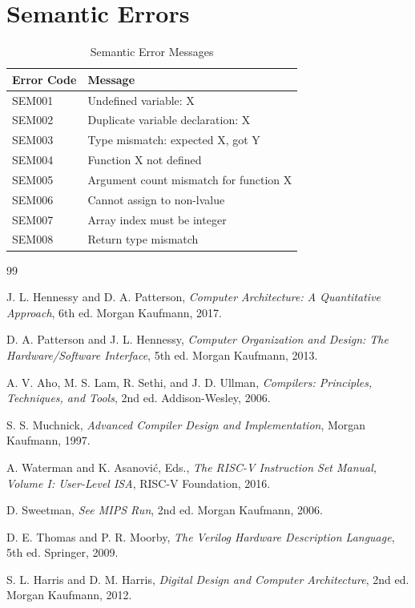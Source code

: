 \documentclass[12pt,a4paper,oneside]{book}
\begin{document}
\section{Semantic Errors}

\begin{table}[H]
\centering
\caption{Semantic Error Messages}
\begin{tabularx}{\textwidth}{|l|X|}
\hline
\textbf{Error Code} & \textbf{Message} \\
\hline
SEM001 & Undefined variable: X \\
SEM002 & Duplicate variable declaration: X \\
SEM003 & Type mismatch: expected X, got Y \\
SEM004 & Function X not defined \\
SEM005 & Argument count mismatch for function X \\
SEM006 & Cannot assign to non-lvalue \\
SEM007 & Array index must be integer \\
SEM008 & Return type mismatch \\
\hline
\end{tabularx}
\end{table}

\begin{thebibliography}{99}

J. L. Hennessy and D. A. Patterson,
\textit{Computer Architecture: A Quantitative Approach},
6th ed. Morgan Kaufmann, 2017.

D. A. Patterson and J. L. Hennessy,
\textit{Computer Organization and Design: The Hardware/Software Interface},
5th ed. Morgan Kaufmann, 2013.

A. V. Aho, M. S. Lam, R. Sethi, and J. D. Ullman,
\textit{Compilers: Principles, Techniques, and Tools},
2nd ed. Addison-Wesley, 2006.

S. S. Muchnick,
\textit{Advanced Compiler Design and Implementation},
Morgan Kaufmann, 1997.

A. Waterman and K. Asanović, Eds.,
\textit{The RISC-V Instruction Set Manual, Volume I: User-Level ISA},
RISC-V Foundation, 2016.

D. Sweetman,
\textit{See MIPS Run},
2nd ed. Morgan Kaufmann, 2006.

D. E. Thomas and P. R. Moorby,
\textit{The Verilog Hardware Description Language},
5th ed. Springer, 2009.

S. L. Harris and D. M. Harris,
\textit{Digital Design and Computer Architecture},
2nd ed. Morgan Kaufmann, 2012.

\end{thebibliography}
\end{document}
